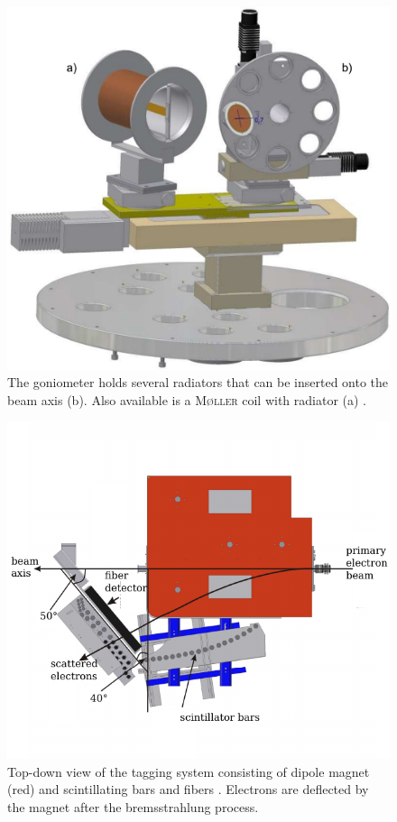 \begin{minipage}[htbp]{.45\linewidth}
	\begin{figure}[H]
		\centering
		\includegraphics[width=\linewidth]{figs/goni-ganz.pdf}
		\caption{The goniometer holds several radiators that can be inserted onto the beam axis (b). Also available is a \textsc{M\o ller} coil with radiator (a) \cite{cb}.\\}
		\label{fig:goni}
	\end{figure}
\end{minipage}
\hfill
\begin{minipage}[htbp]{.49\linewidth}
\begin{figure}[H]
	\centering
	\includegraphics[width=\linewidth]{figs/Tagger.pdf}
	\caption{Top-down view of the tagging system consisting of dipole magnet (red) and scintillating bars and fibers \cite{tagger}. Electrons are deflected by the magnet after the bremsstrahlung process.}
	\label{fig:tagger}
\end{figure}
\end{minipage}
